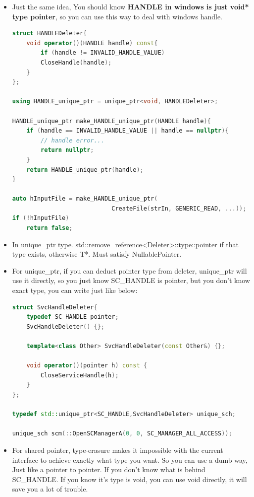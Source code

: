 \documentclass[a4paper,11pt,twoside]{book}
\begin{document}
\begin{itemize}
\item Just the same idea, You should know \textbf{HANDLE in windows is just void* type pointer}, so you can use this way to deal with windows handle.
	
\begin{lstlisting}[frame=single, language=c++]
struct HANDLEDeleter{
	void operator()(HANDLE handle) const{
		if (handle != INVALID_HANDLE_VALUE)
		CloseHandle(handle);
	}
};
	
using HANDLE_unique_ptr = unique_ptr<void, HANDLEDeleter>;
	
HANDLE_unique_ptr make_HANDLE_unique_ptr(HANDLE handle){
	if (handle == INVALID_HANDLE_VALUE || handle == nullptr){
		// handle error...
		return nullptr;
	}
	return HANDLE_unique_ptr(handle);
}
	
auto hInputFile = make_HANDLE_unique_ptr(
                            CreateFile(strIn, GENERIC_READ, ...));
if (!hInputFile)
	return false;
\end{lstlisting}
	
\item In unique\_ptr type. std::remove\_reference<Deleter>::type::pointer if that type exists, otherwise T*. Must satisfy NullablePointer.
	
\item For unique\_ptr, if you can deduct pointer type from deleter, unique\_ptr will use it directly, so you just know SC\_HANDLE is pointer, but you don't know exact type, you can write just like below: 
\begin{lstlisting}[frame=single, language=c++]
struct SvcHandleDeleter{
	typedef SC_HANDLE pointer;
	SvcHandleDeleter() {};
	
	template<class Other> SvcHandleDeleter(const Other&) {};
	
	void operator()(pointer h) const {
		CloseServiceHandle(h);
	}
};
	
typedef std::unique_ptr<SC_HANDLE,SvcHandleDeleter> unique_sch;
	
unique_sch scm(::OpenSCManagerA(0, 0, SC_MANAGER_ALL_ACCESS));
\end{lstlisting}
	
	\item For shared pointer, type-erasure makes it impossible with the current interface to achieve exactly what type you want. So you can use a dumb way, Just like a pointer to pointer. If you don't know what is behind SC\_HANDLE. If you know it's type is void, you can use void directly, it will save you a lot of trouble. 
	

\end{itemize}
\end{document}
